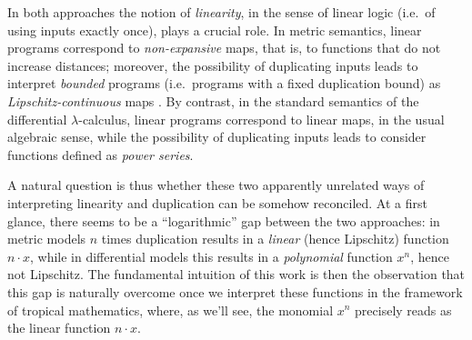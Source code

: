 In both approaches the notion of \emph{linearity}, in the sense of linear logic \cite{girardLl} (i.e.~of using inputs exactly once), plays a crucial role.
In metric semantics, linear programs correspond to \emph{non-expansive} maps, that is, to functions that do not increase distances; moreover, the possibility of duplicating inputs leads to interpret \emph{bounded} programs (i.e.~programs with a fixed duplication bound) as \emph{Lipschitz-continuous} maps \cite{Gaboardi2017}.
By contrast, in the standard semantics of the differential $\lambda$-calculus, linear programs correspond to linear maps, in the usual algebraic sense, while the possibility of duplicating inputs leads to consider functions defined as \emph{power series}.


A natural question is thus whether these two apparently unrelated ways of interpreting linearity and duplication can be somehow reconciled. At a first glance, there seems to be a  ``logarithmic'' gap between the two approaches:
in metric models $n$ times duplication results in a \emph{linear} (hence Lipschitz) function $n\cdot x$, while in differential models this results in a \emph{polynomial} function $x^{n}$, hence not Lipschitz. The fundamental intuition of this work is then the observation that 
this gap is naturally overcome once we interpret these functions in the framework of tropical mathematics, where, as we'll see, the monomial $x^{n}$ precisely reads as the linear function $n\cdot x$.

